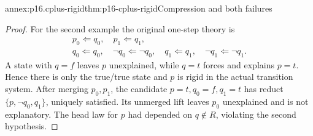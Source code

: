 \begin{annexitem}{annex:p16.cplus-rigid}{thm:p16-cplus-rigid}{Compression and both failures}
\begin{proof}
For the second example the original one-step theory is
\[
\begin{gathered}
 p_0\Leftarrow q_0,\quad p_1\Leftarrow q_1,\\
 q_0\Leftarrow q_0,\quad\neg q_0\Leftarrow\neg q_0,\quad
 q_1\Leftarrow q_1,\quad\neg q_1\Leftarrow\neg q_1.
\end{gathered}
\]
A state with \(q=f\) leaves \(p\) unexplained, while \(q=t\)
forces and explains \(p=t\). Hence there is only the true/true state
and \(p\) is rigid in the actual transition system.
After merging \(p_0,p_1\), the candidate \(p=t,q_0=f,q_1=t\)
has reduct \(\{p,\neg q_0,q_1\}\), uniquely satisfied.
Its unmerged lift leaves \(p_0\) unexplained and is not explanatory.
The head law for \(p\) had depended on \(q\notin R\), violating the
second hypothesis.
\end{proof}
\end{annexitem}


